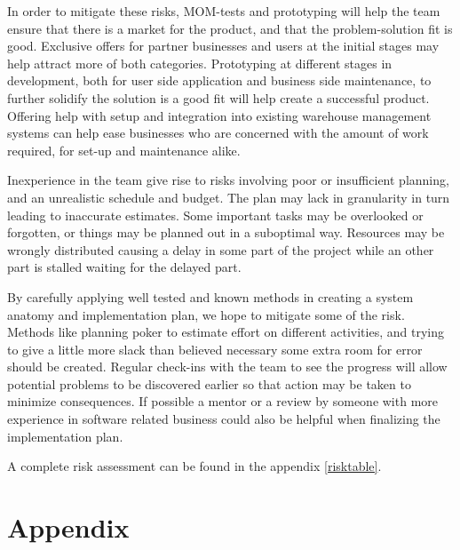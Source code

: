 \documentclass[titlepage]{article}
\begin{document}
In order to mitigate these risks, MOM-tests and prototyping will help the team ensure that there is a market for the product, and that the problem-solution fit is good. Exclusive offers for partner businesses and users at the initial stages may help attract more of both categories. Prototyping at different stages in development, both for user side application and business side maintenance, to further solidify the solution is a good fit will help create a successful product. Offering help with setup and integration into existing warehouse management systems can help ease businesses who are concerned with the amount of work required, for set-up and maintenance alike. 

Inexperience in the team give rise to risks involving poor or insufficient planning, and an unrealistic schedule and budget. The plan may lack in granularity in turn leading to inaccurate estimates. Some important tasks may be overlooked or forgotten, or things may be planned out in a suboptimal way. Resources may be wrongly distributed causing a delay in some part of the project while an other part is stalled waiting for the delayed part.

By carefully applying well tested and known methods in creating a system anatomy and implementation plan, we hope to mitigate some of the risk. Methods like planning poker to estimate effort on different activities, and trying to give a little more slack than believed necessary some extra room for error should be created. Regular check-ins with the team to see the progress will allow potential problems to be discovered earlier so that action may be taken to minimize consequences. If possible a mentor or a review by someone with more experience in software related business could also be helpful when finalizing the implementation plan.

A complete risk assessment can be found in the appendix \ref{risktable}.

\section{Appendix}
\end{document}
